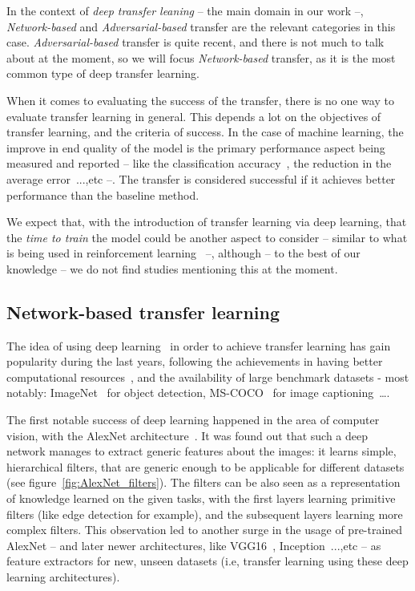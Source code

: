   \par In the context of \textit{deep transfer leaning} -- the main domain in our work --, \textit{Network-based} and \textit{Adversarial-based} transfer are the relevant categories in this case. \textit{Adversarial-based} transfer is quite recent, and there is not much to talk about at the moment, so we will focus \textit{Network-based} transfer, as it is the most common type of deep transfer learning.

  \par When it comes to evaluating the success of the transfer, there is no one way to evaluate transfer learning in general. This depends a lot on the objectives of transfer learning, and the criteria of success. In the case of machine learning, the improve in end quality of the model is the primary performance aspect being measured and reported -- like the classification accuracy~\citep{chattopadhyay2012multisource,long2013transfer,pan2010cross,glorot2011domain}, the reduction in the average error~\citep{pan2010domain}...,etc --. The transfer is considered successful if it achieves better performance than the baseline method.

  \par We expect that, with the introduction of transfer learning via deep learning, that the \textit{time to train} the model could be another aspect to consider -- similar to what is being used in reinforcement learning~\citep{taylor2007cross} --, although -- to the best of our knowledge -- we do not find studies mentioning this at the moment.

  \subsection{Network-based transfer learning}
    \par The idea of using deep learning~\citep{lecun2015deep} in order to achieve transfer learning has gain popularity during the last years, following the achievements in having better computational resources~\citep{raina2009large}, and the availability of large benchmark datasets - most notably: ImageNet~\citep{imagenet_cvpr09} for object detection, MS-COCO~\citep{2014arXiv1405.0312L} for image captioning~\ldots.

    \par The first notable success of deep learning happened in the area of computer vision, with the AlexNet architecture~\citep{krizhevsky2012imagenet}. It was found out that such a deep network manages to extract generic features about the images: it learns simple, hierarchical filters, that are generic enough to be applicable for different datasets (see figure~\ref{fig:AlexNet_filters}). The filters can be also seen as a representation of knowledge learned on the given tasks, with the first layers learning primitive filters (like edge detection for example), and the subsequent layers learning more complex filters. This observation led to another surge in the usage of pre-trained AlexNet -- and later newer architectures, like VGG16~\citep{simonyan2014very}, Inception~\citep{szegedy2015going}...,etc -- as feature extractors for new, unseen datasets (i.e, transfer learning using these deep learning architectures).

